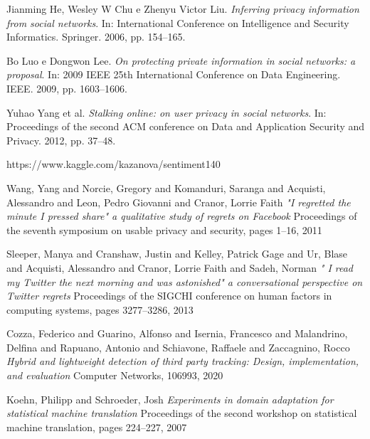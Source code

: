 \begin{thebibliography}{9}
Jianming He, Wesley W Chu e Zhenyu Victor Liu. \newline
\textit{Inferring privacy information from social networks}.\newline
In: International Conference on Intelligence and Security Informatics. Springer. 2006, pp. 154–165.

Bo Luo e Dongwon Lee.\newline
\textit{On protecting private information in social networks: a proposal}.\newline
In: 2009 IEEE 25th International Conference on Data Engineering. IEEE. 2009, pp. 1603–1606.

Yuhao Yang et al.\newline
\textit{Stalking online: on user privacy in social networks}.\newline
In: Proceedings of the second ACM conference on Data and Application Security and Privacy. 2012, pp. 37–48.

https://www.kaggle.com/kazanova/sentiment140

Wang, Yang and Norcie, Gregory and Komanduri, Saranga and Acquisti, Alessandro and Leon, Pedro Giovanni and Cranor, Lorrie Faith\newline
\textit{"I regretted the minute I pressed share" a qualitative study of regrets on Facebook}\newline
Proceedings of the seventh symposium on usable privacy and security, pages 1--16, 2011 

Sleeper, Manya and Cranshaw, Justin and Kelley, Patrick Gage and Ur, Blase and Acquisti, Alessandro and Cranor, Lorrie Faith and Sadeh, Norman\newline
\textit{" I read my Twitter the next morning and was astonished" a conversational perspective on Twitter regrets}\newline
Proceedings of the SIGCHI conference on human factors in computing systems, pages 3277--3286, 2013

Cozza, Federico and Guarino, Alfonso and Isernia, Francesco and Malandrino, Delfina and Rapuano, Antonio and Schiavone, Raffaele and Zaccagnino, Rocco\newline
\textit{Hybrid and lightweight detection of third party tracking: Design, implementation, and evaluation}\newline
Computer Networks, 106993, 2020

Koehn, Philipp and Schroeder, Josh\newline
\textit{Experiments in domain adaptation for statistical machine translation}\newline
Proceedings of the second workshop on statistical machine translation, pages 224--227, 2007

\end{thebibliography}